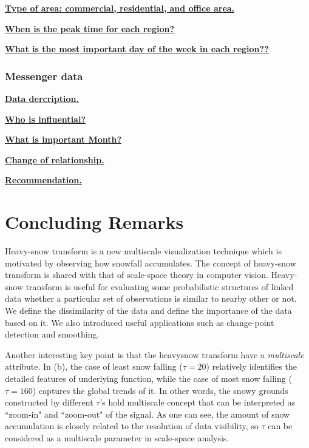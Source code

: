 \documentclass[preprint, review, 12pt]{article}
\theoremstyle{definition}
\theoremstyle{remark}
\begin{document}
\noindent\textbf{\underline{Type of area: commercial, residential, and office area.}}

\noindent\textbf{\underline{When is the peak time for each region?}}

\noindent\textbf{\underline{What is the most important day of the week in each region??}}

\subsubsection{Messenger data} 

\noindent\textbf{\underline{Data dercription.}}

\noindent\textbf{\underline{Who is influential?}}

\noindent\textbf{\underline{What is important Month?}}

\noindent\textbf{\underline{Change of relationship.}}

\noindent\textbf{\underline{Recommendation.}}



\section{Concluding Remarks}
Heavy-snow transform is a new multiscale visualization technique which is motivated by observing how snowfall accumulates. The concept of heavy-snow transform is shared with that of scale-space theory in computer vision. Heavy-snow transform is useful for evaluating some probabilistic structures of linked data whether a particular set of observations is similar to nearby other or not. We define the dissimilarity of the data and define the importance of the data based on it. We also introduced useful applications such as change-point detection and smoothing.

\iffalse
Another interesting key point is that the heavysnow transform have a \emph{multiscale} attribute. In (b), the case of least snow falling ($\tau=20$) relatively identifies the detailed features of underlying function, while the case of most snow falling ($\tau=160$) captures the global trends of it. In other words, the snowy grounds constructed by different $\tau$'s hold multiscale concept that can be interpreted as ``zoom-in" and ``zoom-out" of the signal. As one can see, the amount of snow accumulation is closely related to the resolution of data visibility, so $\tau$ can be considered as a multiscale parameter in scale-space analysis.
\end{document}
